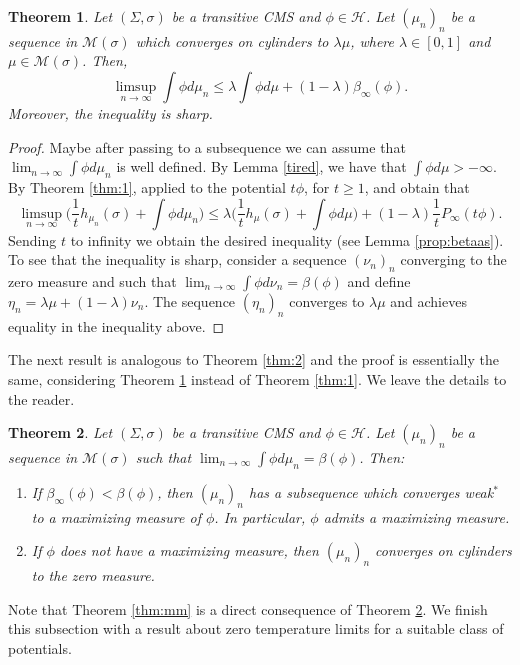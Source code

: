 \documentclass[letterpaper,11pt]{amsart}
\theoremstyle{plain}
\newtheorem{theorem}{Theorem}[section]
\theoremstyle{plain}
\theoremstyle{definition}
\theoremstyle{remark}
\def\M{{\mathcal M}}
\def\H{{\mathcal H}}
\begin{document}
\begin{theorem}\label{thm:maxm}  Let $(\Sigma,\sigma)$ be a transitive CMS and $\phi\in\H$.  Let $(\mu_n)_n$ be a sequence  in $\M(\sigma)$ which converges on cylinders to $\lambda\mu$, where $\lambda\in [0,1]$ and $\mu\in\M(\sigma)$. Then,
$$\limsup_{n\to\infty} \int \phi d\mu_n \le \lambda\int \phi d\mu+(1-\lambda)\beta_\infty(\phi).$$
Moreover, the inequality is sharp.
\end{theorem}
\begin{proof} Maybe after passing to a subsequence we can assume that $\lim_{n\to\infty}\int \phi d \mu_n$ is well defined. By Lemma \ref{tired}, we have that $\int \phi d\mu>-\infty$. By Theorem \ref{thm:1}, applied to the potential $t\phi$, for $t\ge 1$, and obtain that
$$\limsup_{n\to\infty}\bigg(\frac{1}{t}h_{\mu_n}(\sigma)+\int \phi d\mu_n\bigg)\le \lambda\bigg(\frac{1}{t}h_\mu(\sigma)+\int \phi d\mu\bigg)+(1-\lambda)\frac{1}{t}P_\infty(t\phi).$$
Sending $t$ to infinity we obtain the desired inequality (see Lemma \ref{prop:betaas}). To see that the inequality is sharp, consider a sequence $(\nu_n)_n$ converging to the zero measure and such that $\lim_{n\to\infty}\int \phi d\nu_n=\beta(\phi)$ and define $\eta_n=\lambda\mu+(1-\lambda)\nu_n$. The sequence $(\eta_n)_n$ converges to $\lambda\mu$ and achieves equality in the inequality above.
\end{proof}


The next result is analogous to Theorem \ref{thm:2} and the proof is essentially the same, considering Theorem \ref{thm:maxm} instead of Theorem \ref{thm:1}. We leave the details to the reader.

\begin{theorem}\label{maxva} Let $(\Sigma,\sigma)$ be a transitive CMS and $\phi\in \H$.  Let $(\mu_n)_n$ be a sequence in $\M(\sigma)$ such that $\lim_{n\to\infty}\int \phi d\mu_n=\beta(\phi)$. Then:
\begin{enumerate}
\item If $\beta_\infty(\phi)<\beta(\phi)$, then $(\mu_n)_n$ has a subsequence which converges weak$^*$ to a maximizing measure of $\phi$. In particular, $\phi$ admits a maximizing measure.  
\item If $\phi$ does not have a maximizing measure, then $(\mu_n)_n$ converges on cylinders to the zero measure.
\end{enumerate}
\end{theorem}

Note that Theorem \ref{thm:mm} is a direct consequence of Theorem \ref{maxva}.  We finish this subsection with a result about zero temperature limits for a suitable class of potentials.
\end{document}
